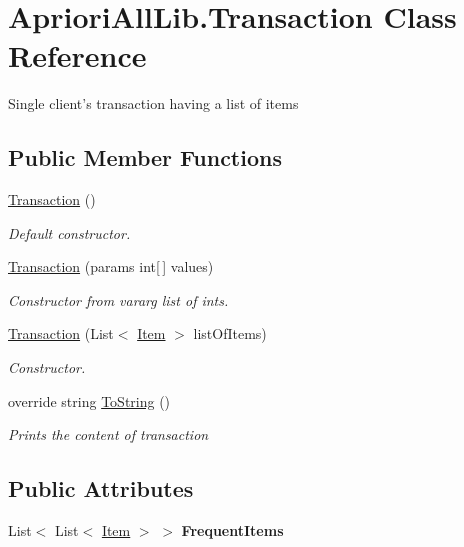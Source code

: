 \hypertarget{class_apriori_all_lib_1_1_transaction}{\section{Apriori\-All\-Lib.\-Transaction Class Reference}
\label{class_apriori_all_lib_1_1_transaction}
}


Single client's transaction having a list of items  


\subsection*{Public Member Functions}
\begin{DoxyCompactItemize}
\item 
\hyperlink{class_apriori_all_lib_1_1_transaction_adad35699bc55fcba5ee7ad28d34bdf53}{Transaction} ()
\begin{DoxyCompactList}\small\item\em Default constructor. \end{DoxyCompactList}\item 
\hyperlink{class_apriori_all_lib_1_1_transaction_a582a1d655d1c0d452a5e5f0b972688dd}{Transaction} (params int\mbox{[}$\,$\mbox{]} values)
\begin{DoxyCompactList}\small\item\em Constructor from vararg list of ints. \end{DoxyCompactList}\item 
\hyperlink{class_apriori_all_lib_1_1_transaction_a4a114cb49deabd17311768a8ecdf38a5}{Transaction} (List$<$ \hyperlink{class_apriori_all_lib_1_1_item}{Item} $>$ list\-Of\-Items)
\begin{DoxyCompactList}\small\item\em Constructor. \end{DoxyCompactList}\item 
override string \hyperlink{class_apriori_all_lib_1_1_transaction_acee1a8846d87f949c63110f7e6eabfe0}{To\-String} ()
\begin{DoxyCompactList}\small\item\em Prints the content of transaction \end{DoxyCompactList}\end{DoxyCompactItemize}
\subsection*{Public Attributes}
\begin{DoxyCompactItemize}
\item 
\hypertarget{class_apriori_all_lib_1_1_transaction_a2ee6b2f74a842edb646ec8f99e5f7b8f}{List$<$ List$<$ \hyperlink{class_apriori_all_lib_1_1_item}{Item} $>$ $>$ {\bfseries Frequent\-Items}}\label{class_apriori_all_lib_1_1_transaction_a2ee6b2f74a842edb646ec8f99e5f7b8f}

\end{DoxyCompactItemize}
